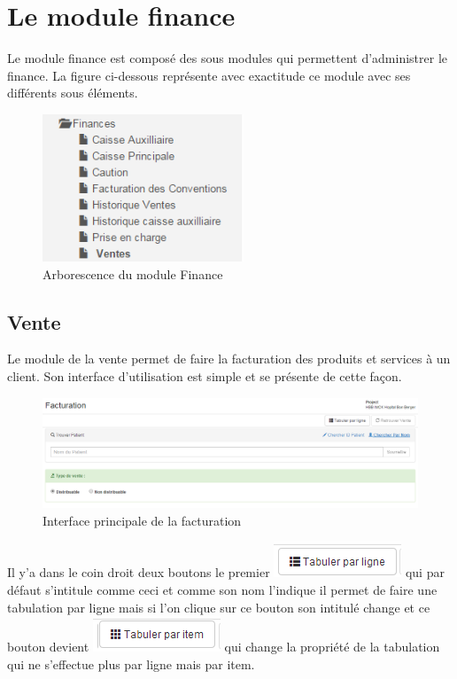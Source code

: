 \documentclass[12pt,a4paper]{report}
\begin{document}
\newpage
\chapter{Le module finance}        
Le module finance est composé des sous modules qui permettent d'administrer le finance. La figure ci-dessous représente avec exactitude ce module avec ses différents sous éléments.

\begin{figure}[h]
\begin{center}
\includegraphics[width=6cm]{pic/FinanceArbo.png}
\end{center}
\caption{Arborescence du module Finance}
\label{Arborescence du module Finance}
\end{figure}


\section{Vente}
Le module de la vente permet de faire la facturation des produits et services à un client. Son interface d'utilisation est simple et se présente de cette façon.

\begin{figure}[h]
\begin{center}
\includegraphics[width=14cm]{pic/InterfacePrinciFact.png}
\end{center}
\caption{Interface principale de la facturation}
\label{Interface principale de la facturation}
\end{figure}

Il y'a dans le coin droit deux boutons le premier \includegraphics[scale=0.7]{pic/tabulerParLigne.png}  qui par défaut s'intitule comme ceci et comme son nom l'indique il permet de faire une tabulation par ligne mais si l'on clique sur ce bouton son intitulé change et ce bouton devient 
\includegraphics[scale=0.7]{pic/tabulerParItem.png}  qui change la propriété de la tabulation qui ne s'effectue plus par ligne mais par item. 
\end{document}
